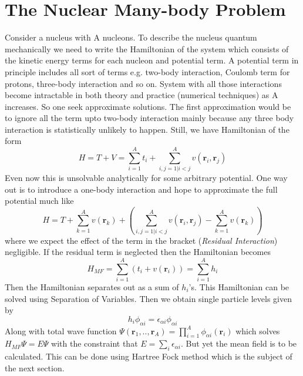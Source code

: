 \documentclass[a4paper]{paper}
\begin{document}
        \section{The Nuclear Many-body Problem}
            Consider a nucleus with A nucleons. To describe the nucleus quantum mechanically we need to write the Hamiltonian of the system which consists of the kinetic energy terms for each nucleon and potential term. A potential term in principle includes all sort of terms e.g. two-body interaction, Coulomb term for protons, three-body interaction and so on. System with all those interactions become intractable in both theory and practice (numerical techniques) as A increases. So one seek approximate solutions. The first approximation would be to ignore all the term upto two-body interaction mainly because any three body interaction is statistically unlikely to happen. Still, we have Hamiltonian of the form
            \begin{equation}
                H = T + V = \sum^{A}_{i=1} t_i + \sum^{A}_{i,j=1|i<j} v(\mathbf{r}_i,\mathbf{r}_j)
            \end{equation}
            Even now this is unsolvable analytically for  some arbitrary potential. One way out is to introduce a one-body interaction and hope to approximate the full potential much like
            \begin{equation}
                H = T + \sum^{A}_{k=1} v(\mathbf{r}_k) + \left(\sum^{A}_{i,j=1|i<j} v(\mathbf{r}_i,\mathbf{r}_j)-\sum^{A}_{k=1} v(\mathbf{r}_k)\right)
            \end{equation}
            where we expect the effect of the term in the bracket (\emph{Residual Interaction}) negligible. If the residual term is neglected then the Hamiltonian becomes
            \begin{equation}
                H_{MF} = \sum^{A}_{i=1} (t_i + v(\mathbf{r}_i) ) = \sum^{A}_{i=1} h_i
            \end{equation}
            Then the Hamiltonian separates out as a sum of $h_i$'s. This Hamiltonian can be solved using Separation of Variables. Then we obtain single particle levels given by
            \begin{equation}
                h_i\phi_{\alpha i} = \epsilon_{\alpha i}\phi_{\alpha i}
            \end{equation}
            Along with total wave function $\Psi(\mathbf{r}_1,..,\mathbf{r}_A) = \prod_{i=1}^{A} \phi_{\alpha i}(\mathbf{r}_i)$ which solves $H_{MF}\Psi = E \Psi$ with the constraint that $E = \sum_{i}\epsilon_{\alpha i}$. But yet the mean field is to be calculated. This can be done using Hartree Fock method which is the subject of the next section.
\end{document}
